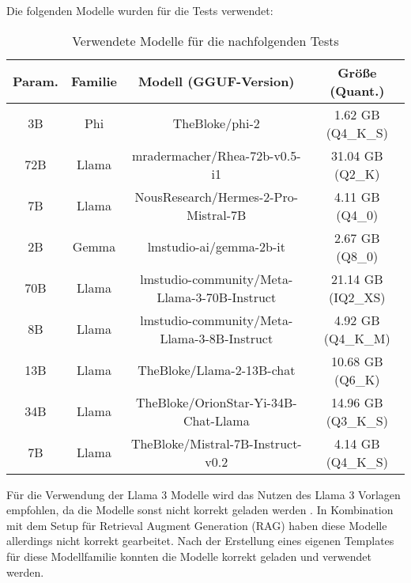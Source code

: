 \documentclass[german,report]{i1thesis}
\begin{document}
Die folgenden Modelle wurden für die Tests verwendet:

\begin{table}[H]
    \centering
    \begin{tabular}{|c|c|c|c|}
        \hline
        \textbf{Param.} & \textbf{Familie} & \textbf{Modell (GGUF-Version)}               & \textbf{Größe (Quant.)}  \\ \hline
        3B              & Phi              & TheBloke/phi-2                               & 1.62 \ac{GB} (Q4\_K\_S)  \\ \hline
        72B             & Llama            & mradermacher/Rhea-72b-v0.5-i1                & 31.04 \ac{GB} (Q2\_K)    \\ \hline
        7B              & Llama            & NousResearch/Hermes-2-Pro-Mistral-7B         & 4.11 \ac{GB} (Q4\_0)     \\ \hline
        2B              & Gemma            & lmstudio-ai/gemma-2b-it                      & 2.67 \ac{GB} (Q8\_0)     \\ \hline
        70B             & Llama            & lmstudio-community/Meta-Llama-3-70B-Instruct & 21.14 \ac{GB} (IQ2\_XS)  \\ \hline
        8B              & Llama            & lmstudio-community/Meta-Llama-3-8B-Instruct  & 4.92 \ac{GB} (Q4\_K\_M)  \\ \hline
        13B             & Llama            & TheBloke/Llama-2-13B-chat                    & 10.68 \ac{GB} (Q6\_K)    \\ \hline
        34B             & Llama            & TheBloke/OrionStar-Yi-34B-Chat-Llama         & 14.96 \ac{GB} (Q3\_K\_S) \\ \hline
        7B              & Llama            & TheBloke/Mistral-7B-Instruct-v0.2            & 4.14 \ac{GB} (Q4\_K\_S)  \\ \hline
    \end{tabular}
    \caption{Verwendete Modelle für die nachfolgenden Tests}%
    \label{tab:verwendete_modelle}
\end{table}

Für die Verwendung der Llama 3 Modelle wird das Nutzen des Llama 3 Vorlagen empfohlen, da die Modelle sonst nicht korrekt geladen werden \autocite{llama3_preset}.
In Kombination mit dem Setup für Retrieval Augment Generation (\ac{RAG}) haben diese Modelle allerdings nicht korrekt gearbeitet.
Nach der Erstellung eines eigenen Templates für diese Modellfamilie konnten die Modelle korrekt geladen und verwendet werden.
\end{document}
